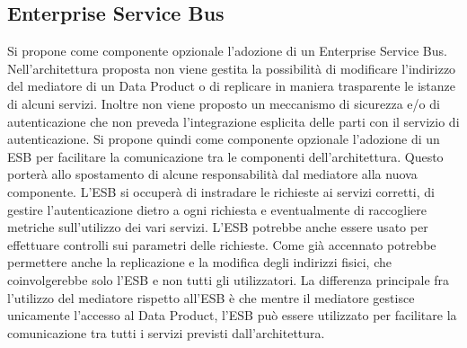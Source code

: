 \documentclass[12pt]{report}
\begin{document}
\subsection{Enterprise Service Bus}
Si propone come componente opzionale l'adozione di un Enterprise Service Bus.
Nell'architettura proposta non viene gestita la possibilità di modificare l'indirizzo del mediatore di un Data Product o di replicare in maniera trasparente le istanze di alcuni servizi.
Inoltre non viene proposto un meccanismo di sicurezza e/o di autenticazione che non preveda l'integrazione esplicita delle parti con il servizio di autenticazione.
Si propone quindi come componente opzionale l'adozione di un ESB per facilitare la comunicazione tra le componenti dell'architettura.
Questo porterà allo spostamento di alcune responsabilità dal mediatore alla nuova componente.
L'ESB si occuperà di instradare le richieste ai servizi corretti, di gestire l'autenticazione dietro a ogni richiesta e  eventualmente di raccogliere metriche sull'utilizzo dei vari servizi.
L'ESB potrebbe anche essere usato per effettuare controlli sui parametri delle richieste.
Come già accennato potrebbe permettere anche la replicazione e la modifica degli indirizzi fisici, che coinvolgerebbe solo l'ESB e non tutti gli utilizzatori.
La differenza principale fra l'utilizzo del mediatore rispetto all'ESB è che mentre il mediatore gestisce unicamente l'accesso al Data Product, l'ESB può essere utilizzato per facilitare la comunicazione tra tutti i servizi previsti dall'architettura.
\end{document}
